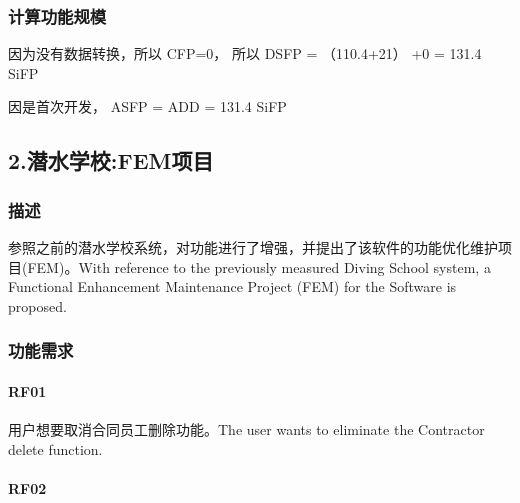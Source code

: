 \hypertarget{ux8ba1ux7b97ux529fux80fdux89c4ux6a21}{%
\subsubsection{计算功能规模}\label{ux8ba1ux7b97ux529fux80fdux89c4ux6a21}}

\begin{description}
\item[]
\end{description}

因为没有数据转换，所以 CFP=0， 所以 DSFP = （110.4+21） +0 = 131.4 SiFP

因是首次开发， ASFP = ADD = 131.4 SiFP

\hypertarget{ux6f5cux6c34ux5b66ux6821femux9879ux76ee}{%
\subsection{2.潜水学校:FEM项目}\label{ux6f5cux6c34ux5b66ux6821femux9879ux76ee}}

\hypertarget{ux63cfux8ff0-1}{%
\subsubsection{描述}\label{ux63cfux8ff0-1}}

参照之前的潜水学校系统，对功能进行了增强，并提出了该软件的功能优化维护项目(FEM)。With
reference to the previously measured Diving School system, a Functional
Enhancement Maintenance Project (FEM) for the Software is proposed.

\hypertarget{ux529fux80fdux9700ux6c42-1}{%
\subsubsection{功能需求}\label{ux529fux80fdux9700ux6c42-1}}

\hypertarget{rf01-1}{%
\paragraph{RF01}\label{rf01-1}}

用户想要取消合同员工删除功能。The user wants to eliminate the Contractor
delete function.

\hypertarget{rf02-1}{%
\paragraph{RF02}\label{rf02-1}}

